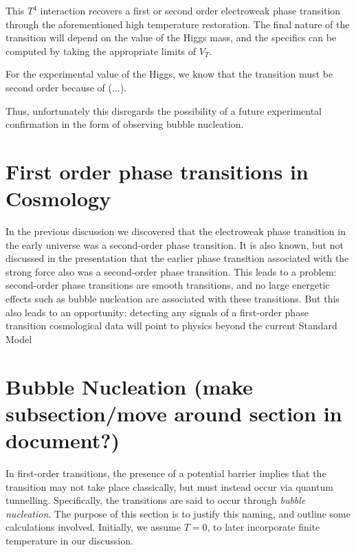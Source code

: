 \documentclass{article}
\numberwithin{equation}{section}
\begin{document}
This $T^4$ interaction recovers a first or second order electroweak phase transition through the aforementioned high temperature restoration. The final nature of the transition will depend on the value of the Higgs mass, and the specifics can be computed by taking the appropriate limits of $V_T$.

For the experimental value of the Higgs, we know that the transition must be second order because of (...).

Thus, unfortunately this disregards the possibility of a future experimental confirmation in the form of observing bubble nucleation.



\section{First order phase transitions in Cosmology}
In the previous discussion we discovered that the electroweak phase transition in the early universe was a second-order phase transition.
It is also known, but not discussed in the presentation that the earlier phase transition associated with the strong force also was a second-order
phase transition. This leads to a problem: second-order phase transitions are smooth transitions, and no large energetic effects such as bubble 
nucleation are associated with these transitions. But this also leads to an opportunity: detecting any signals of a first-order phase transition 
cosmological data will point to physics beyond the current Standard Model

\section{Bubble Nucleation (make subsection/move around section in document?)}

In first-order transitions, the presence of a potential barrier implies that the transition may not take place classically, but must instead occur via quantum tunnelling. Specifically, the transitions are said to occur through \emph{bubble nucleation}. The purpose of this section is to justify this naming, and outline some calculations involved. Initially, we assume $T=0$, to later incorporate finite temperature in our discussion.
\end{document}
